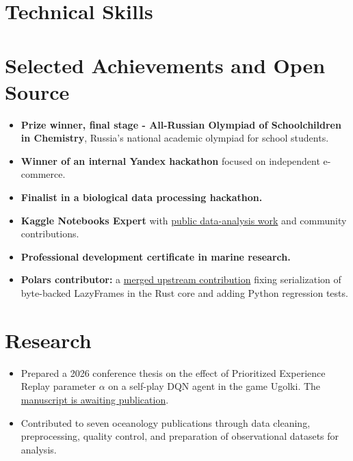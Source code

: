 \documentclass[10pt,a4paper]{article}
\begin{document}
\section{Technical Skills}

{\cvsmall
{}
}

\section{Selected Achievements and Open Source}

\begin{itemize}
  \item \textbf{Prize winner, final stage - All-Russian Olympiad of Schoolchildren in Chemistry}, Russia's national academic olympiad for school students.
  \item \textbf{Winner of an internal Yandex hackathon} focused on independent e-commerce.
  \item \textbf{Finalist in a biological data processing hackathon.}
  \item \textbf{Kaggle Notebooks Expert} with \href{https://www.kaggle.com/samoilovmikhail}{public data-analysis work} and community contributions.
  \item \textbf{Professional development certificate in marine research.}
  \item \textbf{Polars contributor:} a \href{https://github.com/pola-rs/polars/pull/28568}{merged upstream contribution} fixing serialization of byte-backed LazyFrames in the Rust core and adding Python regression tests.
\end{itemize}

\section{Research}

\begin{itemize}
  \item Prepared a 2026 conference thesis on the effect of Prioritized Experience Replay parameter $\alpha$ on a self-play DQN agent in the game Ugolki. The \href{https://github.com/Samoilov2004/UgolkiEngine/blob/main/report/%D0%A1%D0%B0%D0%BC%D0%BE%D0%B9%D0%BB%D0%BE%D0%B2_%D1%82%D0%B5%D0%B7%D0%B8%D1%81%D1%8B.pdf}{manuscript is awaiting publication}.
  \item Contributed to seven oceanology publications through data cleaning, preprocessing, quality control, and preparation of observational datasets for analysis.
\end{itemize}
\end{document}
